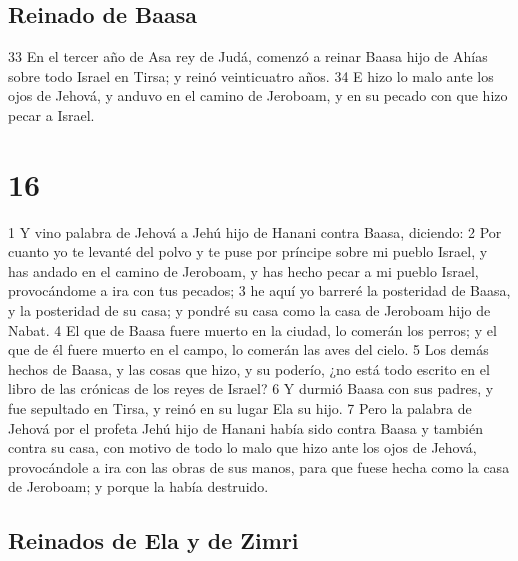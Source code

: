 \section*{Reinado de Baasa}

33 En el tercer año de Asa rey de Judá, comenzó a reinar Baasa hijo de Ahías sobre todo Israel en Tirsa; y reinó veinticuatro años.
34 E hizo lo malo ante los ojos de Jehová, y anduvo en el camino de Jeroboam, y en su pecado con que hizo pecar a Israel.

\chapter{16}


1 Y vino palabra de Jehová a Jehú hijo de Hanani contra Baasa, diciendo:
2 Por cuanto yo te levanté del polvo y te puse por príncipe sobre mi pueblo Israel, y has andado en el camino de Jeroboam, y has hecho pecar a mi pueblo Israel, provocándome a ira con tus pecados;
3 he aquí yo barreré la posteridad de Baasa, y la posteridad de su casa; y pondré su casa como la casa de Jeroboam hijo de Nabat.
4 El que de Baasa fuere muerto en la ciudad, lo comerán los perros; y el que de él fuere muerto en el campo, lo comerán las aves del cielo.
5 Los demás hechos de Baasa, y las cosas que hizo, y su poderío, ¿no está todo escrito en el libro de las crónicas de los reyes de Israel?
6 Y durmió Baasa con sus padres, y fue sepultado en Tirsa, y reinó en su lugar Ela su hijo.
7 Pero la palabra de Jehová por el profeta Jehú hijo de Hanani había sido contra Baasa y también contra su casa, con motivo de todo lo malo que hizo ante los ojos de Jehová, provocándole a ira con las obras de sus manos, para que fuese hecha como la casa de Jeroboam; y porque la había destruido.
\section*{Reinados de Ela y de Zimri}

